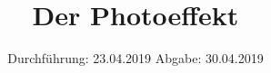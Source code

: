 

\subject{V500}
\title{Der Photoeffekt}
\date{
  Durchführung: 23.04.2019
  \hspace{3em}
  Abgabe: 30.04.2019
}


\maketitle
\thispagestyle{empty}
\tableofcontents
\newpage

%


%




\printbibliography

